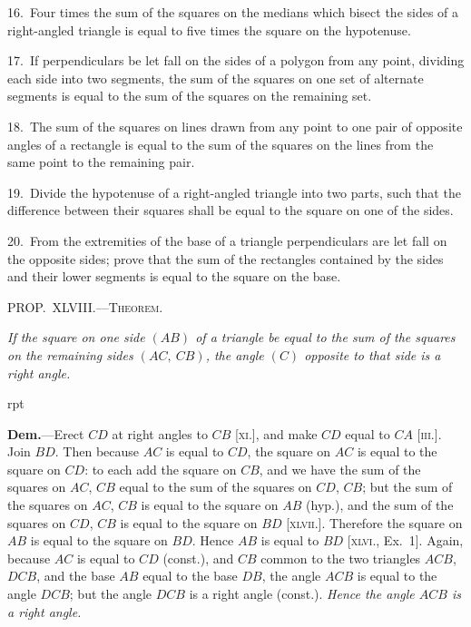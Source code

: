 \documentclass[oneside]{book}
\newcounter{wrapwidth}
\newcommand\mypropl[2]{
\bigskip\Needspace*{4\baselineskip}\begin{center}\textsc{#1}\end{center}
\hspace{\parindent}\emph{#2}\par\medskip
}
\newcommand\imgflow[3]{
\setcounter{wrapwidth}{#1}

\begin{wrapfigure}[#2]{r}{\value{wrapwidth}pt}
\begin{center}
\vspace{-0.3in}

\end{center}
\end{wrapfigure}
}
\begin{document}
\begin{footnotesize}
16.~Four times the sum of the squares on the medians which
bisect the sides of a right-angled triangle is equal to five times
the square on the hypotenuse.


17.~If perpendiculars be let fall on the sides of a polygon from
any point, dividing each side into two segments, the sum of the
squares on one set of alternate segments is equal to the sum of the
squares on the remaining set.

18.~The sum of the squares on lines drawn from any point to
one pair of opposite angles of a rectangle is equal to the sum of
the squares on the lines from the same point to the remaining
pair.

19.~Divide the hypotenuse of a right-angled triangle into two
parts, such that the difference between their squares shall be
equal to the square on one of the sides.

20.~From the extremities of the base of a triangle perpendiculars
are let fall on the opposite sides; prove that the sum of the
rectangles contained by the sides and their lower segments is
equal to the square on the base.
\par\end{footnotesize}


\mypropl{PROP\@.~XLVIII\@.---Theorem.}{If the square on one side $(AB)$ of a triangle be equal to
the sum of the squares on the remaining sides $(AC,\ CB)$,
the angle $(C)$ opposite to that side is a right angle.}


\imgflow{107}{9}{f070}

\textbf{Dem.}---Erect $CD$ at right angles to $CB$ [\textsc{xi}.], and
make $CD$ equal to $CA$ [\textsc{iii}.]. Join
$BD$. Then because $AC$ is equal
to $CD$, the square on $AC$ is equal
to the square on $CD$: to each add
the square on $CB$, and we have the
sum of the squares on $AC$, $CB$
equal to the sum of the squares
on $CD$, $CB$; but the sum of the
squares on $AC$, $CB$ is equal to the
square on $AB$ (hyp.), and the sum of the squares on
$CD$, $CB$ is equal to the square on $BD$ [\textsc{xlvii}.]. Therefore
the square on $AB$ is equal to the square on $BD$.
Hence $AB$ is equal to $BD$ [\textsc{xlvi}., Ex.~1]. Again, because
$AC$ is equal to $CD$ (const.), and $CB$ common to
the two triangles $ACB$, $DCB$, and the base $AB$ equal
to the base $DB$, the angle $ACB$ is equal to the angle
$DCB$; but the angle $DCB$ is a right angle (const.).
\emph{Hence the angle $ACB$ is a right angle.}\par\medskip
\end{document}
